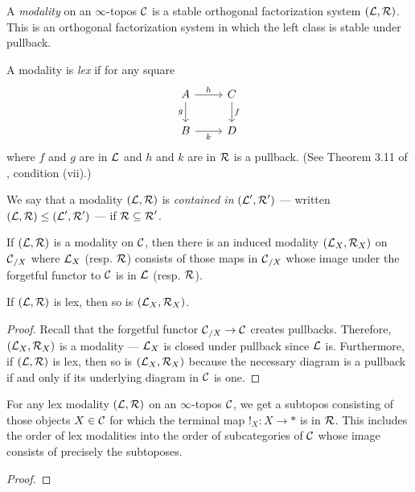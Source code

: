 \begin{defn}
A \emph{modality} on an $\infty$-topos $\Ca$ is a stable orthogonal factorization
system $(\La, \Ra)$. This is an orthogonal factorization system in which the
left class is stable under pullback.

A modality is \emph{lex} if for any square
\[
\begin{tikzcd}
A \arrow[r, "h"] \arrow[d, "g"'] & C \arrow[d, "f"] \\
B \arrow[r, "k"']                & D               
\end{tikzcd}
\]
where $f$ and $g$ are in $\La$ and $h$ and $k$ are in $\Ra$ is a pullback. (See
Theorem 3.11 of \cite{RSS:Modalties.in.HoTT}, condition (vii).)


We say that a modality $(\La, \Ra)$ is \emph{contained in} $(\La', \Ra')$ ---
written $(\La, \Ra) \leq (\La', \Ra')$ --- if $\Ra \subseteq \Ra'$.
\end{defn}

\begin{prop}
If $(\La, \Ra)$ is a modality on $\Ca$, then there is an induced modality $(\La_X,
\Ra_X)$ on $\Ca_{/X}$ where $\La_X$ (resp. $\Ra$) consists of those maps in $\Ca_{/X}$
whose image under the forgetful functor to $\Ca$ is in $\La$ (resp. $\Ra$).

If $(\La, \Ra)$ is lex, then so is $(\La_X, \Ra_X)$.
\end{prop}
\begin{proof}

Recall that the forgetful functor $\Ca_{/X} \to \Ca$ creates pullbacks. Therefore,
$(\La_X, \Ra_X)$ is a modality --- $\La_X$ is closed under pullback since $\La$
is. Furthermore, if $(\La, \Ra)$ is lex, then so is $(\La_X, \Ra_X)$ because the
necessary diagram is a pullback if and only if its underlying diagram in $\Ca$
is one. 
\end{proof}

\begin{prop}
  For any lex modality $(\La, \Ra)$ on an $\infty$-topos $\Ca$, we get a subtopos
  consisting of those objects $X \in \Ca$ for which the terminal map $!_X : X
  \to \ast$ is in $\Ra$. This includes the order of lex modalities into the
  order of subcategories of $\Ca$ whose image consists of precisely the subtoposes.
\end{prop}
\begin{proof}
\end{proof}

